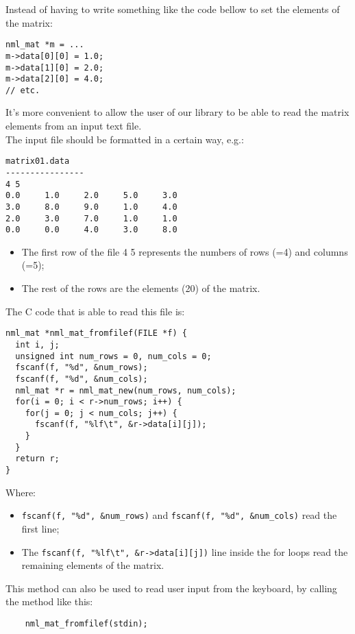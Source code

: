Instead of having to write something like the code bellow to set the elements of the matrix:

\begin{verbatim}
nml_mat *m = ...
m->data[0][0] = 1.0;
m->data[1][0] = 2.0;
m->data[2][0] = 4.0;
// etc. 
\end{verbatim}

It’s more convenient to allow the user of our library to be able to read the matrix elements from an input text file.
\\
The input file should be formatted in a certain way, e.g.:

\begin{verbatim}
matrix01.data
----------------
4 5
0.0     1.0     2.0     5.0     3.0
3.0     8.0     9.0     1.0     4.0
2.0     3.0     7.0     1.0     1.0
0.0     0.0     4.0     3.0     8.0
\end{verbatim}

\begin{itemize}
\item The first row of the file 4 5 represents the numbers of rows (=4) and columns (=5);
\item The rest of the rows are the elements (20) of the matrix.
\end{itemize}

The C code that is able to read this file is:

\begin{verbatim}
nml_mat *nml_mat_fromfilef(FILE *f) {
  int i, j;
  unsigned int num_rows = 0, num_cols = 0;
  fscanf(f, "%d", &num_rows);
  fscanf(f, "%d", &num_cols);
  nml_mat *r = nml_mat_new(num_rows, num_cols);
  for(i = 0; i < r->num_rows; i++) {
    for(j = 0; j < num_cols; j++) {
      fscanf(f, "%lf\t", &r->data[i][j]);
    }
  }
  return r;
} 
\end{verbatim}

Where:

\begin{itemize}
\item {\tt fscanf(f, "\%d", \&num\_rows)} 
and {\tt fscanf(f, "\%d", \&num\_cols)} read the first line;
\item The {\tt fscanf(f, "\%lf\textbackslash t", \&r->data[i][j])} line inside the for loops read the remaining elements of the matrix.
\end{itemize}

This method can also be used to read user input from the keyboard, by calling the method like this:

\begin{verbatim}
    nml_mat_fromfilef(stdin);
\end{verbatim}

